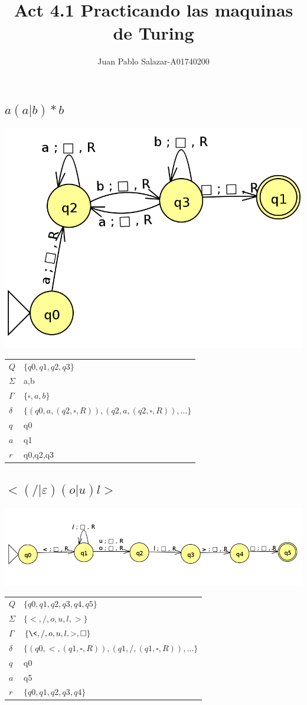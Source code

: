 \documentclass{jhwhw}
\newcommand{\mytitle}{Act 4.1 Practicando las maquinas de Turing}
\begin{document}
\author{Juan Pablo Salazar-A01740200}
\title{\mytitle}

\maketitle

\subsection{$a(a|b)*b$}
\begin{center}
\includegraphics[width=0.5\linewidth]{imgs/maquina1.png}
\begin{table}[h]
\begin{tabular}{l|l}
$Q$      & $\{q0,q1,q2,q3\}$\\
$\Sigma$ &  {a,b}\\
$\Gamma$ &  $\{\square , a,b\}$\\
$\delta$  &  $\{(q0,a,(q2,\square,R)),(q2,a,(q2,\square,R)),...\}$\\
$q$      & q0 \\
$a$      & q1 \\
$r$      & {q0,q2,q3}
\end{tabular}
\end{table}
\end{center}

\subsection{$<(/|\varepsilon)(o|u)l>$}
\begin{center}
\includegraphics[width=\linewidth]{imgs/maquina2.png}
\begin{table}[h]
\begin{tabular}{l|l}
$Q$      & $\{q0,q1,q2,q3,q4,q5\}$\\
$\Sigma$ &  $\{<,/,o,u,l,>\}$\\
$\Gamma$ &  $\{\<,/,o,u,l,>,\square\}$\\
$\delta$  &  $\{(q0,<,(q1,\square,R)),(q1,/,(q1,\square,R)),...\}$\\
$q$      & q0 \\
$a$      & q5 \\
$r$      & $\{q0,q1,q2,q3,q4\}$
\end{tabular}
\end{table}
\end{center}
\end{document}
